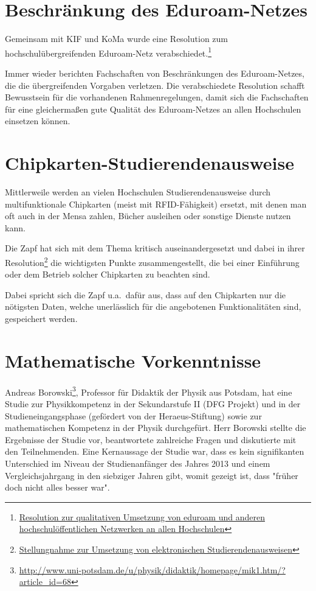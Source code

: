 \documentclass{scrartcl}
\begin{document}
\section*{Beschränkung des Eduroam-Netzes}

Gemeinsam mit KIF und KoMa wurde eine Resolution zum hochschulübergreifenden
Eduroam-Netz verabschiedet.\footnote{\href{http://www.zapfev.de/resolutionen/sose15/Netzneutralitaet\_in\_Universitaetsnetzen/Resolution\_SoSe15\_Netzneutralit\%C3\%A4t\_in\_Universit\%C3\%A4tsnetzen.pdf}{Resolution zur qualitativen Umsetzung von eduroam und anderen hochschulöffentlichen Netzwerken an allen Hochschulen}}

Immer wieder berichten Fachschaften von Beschränkungen des Eduroam-Netzes, die
die übergreifenden Vorgaben verletzen. Die verabschiedete Resolution schafft 
Bewusstsein für die vorhandenen Rahmenregelungen, damit sich die Fachschaften
für eine gleichermaßen gute Qualität des Eduroam-Netzes an allen Hochschulen
einsetzen können.

\section*{Chipkarten-Studierendenausweise}

Mittlerweile werden an vielen Hochschulen Studierendenausweise durch
multifunktionale Chipkarten (meist mit RFID-Fähigkeit) ersetzt, mit denen man
oft auch in der Mensa zahlen, Bücher ausleihen oder sonstige Dienste nutzen
kann.

Die Zapf hat sich mit dem Thema kritisch auseinandergesetzt und dabei in ihrer
Resolution\footnote{\href{http://www.zapfev.de/resolutionen/sose15/Umsetzung\_von\_elektronischen\_Studierendenausweisen/Resolution\_SoSe15\_Umsetzung\_von\_elektronischen\_Studierendenausweisen.pdf}{Stellungnahme zur Umsetzung von elektronischen Studierendenausweisen}} die wichtigsten Punkte zusammengestellt, die bei einer
Einführung oder dem Betrieb solcher Chipkarten zu beachten sind.

Dabei spricht sich die Zapf u.a.\ dafür aus, dass auf den Chipkarten nur die
nötigsten Daten, welche unerlässlich für die angebotenen Funktionalitäten sind,
gespeichert werden.

\section*{Mathematische Vorkenntnisse}

Andreas Borowski\footnote{\href{http://www.uni-potsdam.de/u/physik/didaktik/homepage/mik1.htm/?article\_id=68}{\url{http://www.uni-potsdam.de/u/physik/didaktik/homepage/mik1.htm/?article\_id=68}}},
Professor für Didaktik der Physik aus Potsdam, hat eine Studie zur Physikkompetenz
in der Sekundarstufe II (DFG Projekt) und in der Studieneingangsphase
(gefördert von der Heraeus-Stiftung) sowie zur mathematischen Kompetenz in
der Physik durchgefürt. Herr Borowski stellte die Ergebnisse der Studie vor, beantwortete zahlreiche Fragen und diskutierte mit den Teilnehmenden. Eine Kernaussage der Studie war, dass es kein signifikanten Unterschied im Niveau der Studienanfänger des Jahres 2013 und einem Vergleichsjahrgang in den siebziger Jahren gibt, womit gezeigt ist, dass "früher doch nicht alles besser war".
\end{document}
